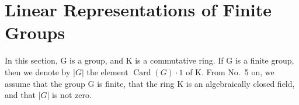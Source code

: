 \section{Linear Representations of Finite Groups}

In this section, G is a group, and K is a commutative ring. If G is a finite group, then we denote by \(|G|\) the element \(\operatorname{Card}(G) \cdot 1\) of K. From No.~5 on, we assume that the group G is finite, that the ring K is an algebraically closed field, and that \(|G|\) is not zero.

